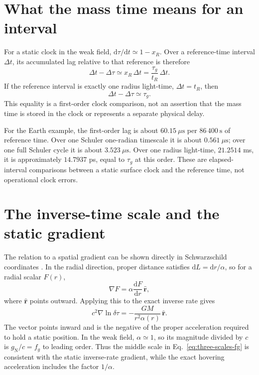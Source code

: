 \documentclass[12pt]{article}
\begin{document}
\section{What the mass time means for an interval}

For a static clock in the weak field, $\mathrm{d}\tau/\mathrm{d}t\simeq1-x_R$. Over a reference-time interval $\Delta t$, its accumulated lag relative to that reference is therefore
\begin{equation}
  \Delta t-\Delta\tau
  \simeq x_R\,\Delta t
  =\frac{\tau_g}{t_R}\,\Delta t.
  \label{eq:lag}
\end{equation}
If the reference interval is exactly one radius light-time, $\Delta t=t_R$, then
\begin{equation}
  \Delta t-\Delta\tau\simeq\tau_g.
  \label{eq:mass-time-lag}
\end{equation}
This equality is a first-order clock comparison, not an assertion that the mass time is stored in the clock or represents a separate physical delay.

For the Earth example, the first-order lag is about $60.15\ \mu\mathrm{s}$ per $86\,400\ \mathrm{s}$ of reference time. Over one Schuler one-radian timescale it is about $0.561\ \mu\mathrm{s}$; over one full Schuler cycle it is about $3.523\ \mu\mathrm{s}$. Over one radius light-time, $21.2514$ ms, it is approximately $14.7937$ ps, equal to $\tau_g$ at this order. These are elapsed-interval comparisons between a static surface clock and the reference time, not operational clock errors.

\section{The inverse-time scale and the static gradient}

The relation to a spatial gradient can be shown directly in Schwarzschild coordinates \cite{Schwarzschild}. In the radial direction, proper distance satisfies $\mathrm{d}L=\mathrm{d}r/\alpha$, so for a radial scalar $F(r)$,
\begin{equation}
  \nabla F=\alpha\frac{\mathrm{d}F}{\mathrm{d}r}\,\hat{\mathbf r},
  \label{eq:proper-gradient}
\end{equation}
where $\hat{\mathbf r}$ points outward. Applying this to the exact inverse rate gives
\begin{equation}
  c^2\nabla\ln\delta\tau
  =-\frac{GM}{r^2\alpha(r)}\,\hat{\mathbf r}.
  \label{eq:exact-gradient}
\end{equation}
The vector points inward and is the negative of the proper acceleration required to hold a static position. In the weak field, $\alpha\simeq1$, so its magnitude divided by $c$ is $g_{\mathrm{N}}/c=f_g$ to leading order. Thus the middle scale in Eq.~\eqref{eq:three-scales-fg} is consistent with the static inverse-rate gradient, while the exact hovering acceleration includes the factor $1/\alpha$.
\end{document}
